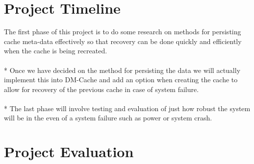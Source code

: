 \documentclass[letterpaper,12pt]{article}
\begin{document}

\section*{Project Timeline}

The first phase of this project is to do some research on methods for
persisting cache meta-data effectively so that recovery can be done
quickly and efficiently when the cache is being recreated. \\ \\*
%
Once we have decided on the method for persisting the data we will
actually implement this into DM-Cache and add an option when creating
the cache to allow for recovery of the previous cache in case of
system failure. \\ \\*
%
The last phase will involve testing and evaluation of just how robust
the system will be in the even of a system failure such as power or
system crash.


\section*{Project Evaluation}

\end{document}
